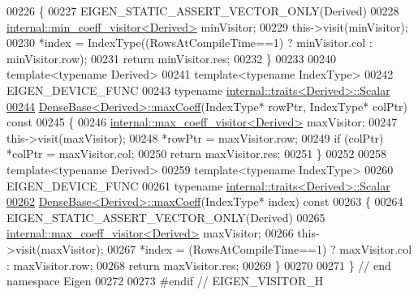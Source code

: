 \begin{DoxyCode}
00226 \textcolor{keyword}{}\{
00227   EIGEN\_STATIC\_ASSERT\_VECTOR\_ONLY(Derived)
00228   \hyperlink{struct_eigen_1_1internal_1_1min__coeff__visitor}{internal::min\_coeff\_visitor<Derived>} minVisitor;
00229   this->visit(minVisitor);
00230   *index = IndexType((RowsAtCompileTime==1) ? minVisitor.col : minVisitor.row);
00231   \textcolor{keywordflow}{return} minVisitor.res;
00232 \}
00233 
00240 \textcolor{keyword}{template}<\textcolor{keyword}{typename} Derived>
00241 \textcolor{keyword}{template}<\textcolor{keyword}{typename} IndexType>
00242 EIGEN\_DEVICE\_FUNC
00243 \textcolor{keyword}{typename} \hyperlink{struct_eigen_1_1internal_1_1traits}{internal::traits<Derived>::Scalar}
\hyperlink{group___core___module_ab8318ab23b3d421b809fef0cb24f69e3}{00244} \hyperlink{group___core___module_ac0d151ec47eb7a44a3a5ba1587ddbeb4}{DenseBase<Derived>::maxCoeff}(IndexType* rowPtr, IndexType* colPtr)\textcolor{keyword}{ const}
00245 \textcolor{keyword}{}\{
00246   \hyperlink{struct_eigen_1_1internal_1_1max__coeff__visitor}{internal::max\_coeff\_visitor<Derived>} maxVisitor;
00247   this->visit(maxVisitor);
00248   *rowPtr = maxVisitor.row;
00249   \textcolor{keywordflow}{if} (colPtr) *colPtr = maxVisitor.col;
00250   \textcolor{keywordflow}{return} maxVisitor.res;
00251 \}
00252 
00258 \textcolor{keyword}{template}<\textcolor{keyword}{typename} Derived>
00259 \textcolor{keyword}{template}<\textcolor{keyword}{typename} IndexType>
00260 EIGEN\_DEVICE\_FUNC
00261 \textcolor{keyword}{typename} \hyperlink{struct_eigen_1_1internal_1_1traits}{internal::traits<Derived>::Scalar}
\hyperlink{group___core___module_ac7f03010f4e0891c90cdcfe123f45223}{00262} \hyperlink{group___core___module_ac0d151ec47eb7a44a3a5ba1587ddbeb4}{DenseBase<Derived>::maxCoeff}(IndexType* index)\textcolor{keyword}{ const}
00263 \textcolor{keyword}{}\{
00264   EIGEN\_STATIC\_ASSERT\_VECTOR\_ONLY(Derived)
00265   \hyperlink{struct_eigen_1_1internal_1_1max__coeff__visitor}{internal::max\_coeff\_visitor<Derived>} maxVisitor;
00266   this->visit(maxVisitor);
00267   *index = (RowsAtCompileTime==1) ? maxVisitor.col : maxVisitor.row;
00268   \textcolor{keywordflow}{return} maxVisitor.res;
00269 \}
00270 
00271 \} \textcolor{comment}{// end namespace Eigen}
00272 
00273 \textcolor{preprocessor}{#endif // EIGEN\_VISITOR\_H}
\end{DoxyCode}
